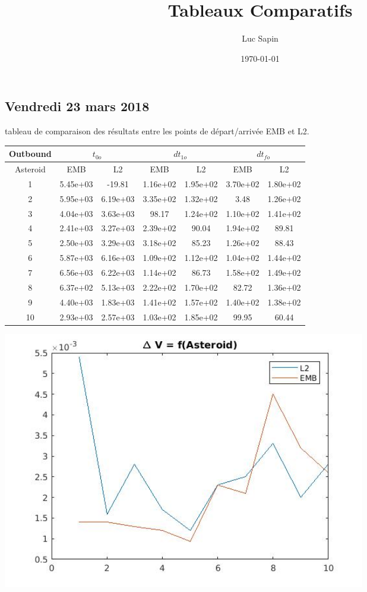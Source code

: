 \documentclass[fleqn,%
a4paper,11pt]{scrbook}
\title{Tableaux Comparatifs}
\author{Luc Sapin}
\date{\today}
\begin{document}
\maketitle
\chapter*{}
\label{cha:cr-reu}
\section*{Vendredi 23 mars 2018}
tableau de comparaison des résultats entre les points de départ/arrivée EMB et L2.\\


\begin{tabular}{|c||c|c||c|c||c|c|}
	\hline
	\textbf{Outbound} & \multicolumn{2}{c||}{$t_{0o}$} &  \multicolumn{2}{c||}{$dt_{1o}$} & \multicolumn{2}{c|}{$dt_{fo}$} \\
	\hline
	Asteroid & EMB & L2 & EMB & L2 & EMB & L2 \\
	\hline
	1 & 5.45e+03 & -19.81 & 1.16e+02 & 1.95e+02 & 3.70e+02 & 1.80e+02 \\
	\hline
	2 & 5.95e+03 & 6.19e+03 & 3.35e+02 & 1.32e+02 & 3.48 & 1.26e+02 \\
	\hline
	3 & 4.04e+03 & 3.63e+03 & 98.17 & 1.24e+02 & 1.10e+02 & 1.41e+02 \\
	\hline
	4 & 2.41e+03 & 3.27e+03 & 2.39e+02 & 90.04 & 1.94e+02 & 89.81 \\
	\hline
	5 & 2.50e+03 & 3.29e+03 & 3.18e+02 & 85.23 & 1.26e+02 & 88.43 \\
	\hline
	6 & 5.87e+03 & 6.16e+03 & 1.09e+02 & 1.12e+02 & 1.04e+02 & 1.44e+02 \\
	\hline
	7 & 6.56e+03 & 6.22e+03 & 1.14e+02 & 86.73 & 1.58e+02 & 1.49e+02 \\
	\hline
	8 & 6.37e+02 & 5.13e+03 & 2.22e+02 & 1.70e+02 & 82.72 & 1.36e+02 \\
	\hline
	9 & 4.40e+03 & 1.83e+03 & 1.41e+02 & 1.57e+02 & 1.40e+02 & 1.38e+02 \\
	\hline
	10 & 2.93e+03 & 2.57e+03 & 1.03e+02 & 1.85e+02 & 99.95 & 60.44 \\
	\hline
\end{tabular}

\bigbreak

\includegraphics[width=0.7\textwidth]{OutboundDeltaV10Ast.jpg}
\end{document}
